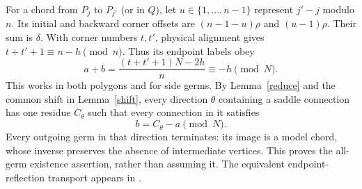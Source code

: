 \documentclass[11pt]{article}
\begin{document}
For a chord from $P_j$ to $P_{j'}$ (or in $Q$), let
$u\in\{1,\ldots,n-1\}$ represent $j'-j$ modulo $n$.
Its initial and backward corner offsets are $(n-1-u)\rho$ and
$(u-1)\rho$. Their sum is $\delta$.
With corner numbers $t,t'$, physical alignment gives
$t+t'+1\equiv n-h\pmod n$. Thus its endpoint labels obey
\begin{equation}\label{modelsum}
a+b=\frac{(t+t'+1)N-2h}{n}\equiv-h\pmod N .
\end{equation}
This works in both polygons and for side germs.
By Lemma~\ref{reduce} and the common shift in Lemma~\ref{shift},
every direction $\theta$ containing a saddle connection has one residue
$C_\theta$ such that every connection in it satisfies
\begin{equation}\label{reflection}
b=C_\theta-a\pmod N.
\end{equation}
Every outgoing germ in that direction terminates: its image is a model
chord, whose inverse preserves the absence of intermediate vertices.
This proves the all-germ existence assertion, rather than assuming it.
The equivalent endpoint-reflection transport appears in
\cite[Lemma~3.1]{Ferudun}.
\end{document}
